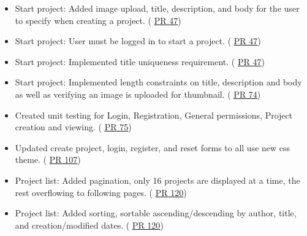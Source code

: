 \documentclass[11pt]{report}
\begin{document}
    \begin{itemize}
        \item Start project: Added image upload, title, description, and body for the user to specify when creating a project. (\color{blue} \href{https://github.com/uidaho/squireproject/pull/47}{\underline{PR 47}}\color{black})
        \item Start project: User must be logged in to start a project. (\color{blue} \href{https://github.com/uidaho/squireproject/pull/47}{\underline{PR 47}}\color{black})
        \item Start project: Implemented title uniqueness requirement. (\color{blue} \href{https://github.com/uidaho/squireproject/pull/47}{\underline{PR 47}}\color{black})
        \item Start project: Implemented length constraints on title, description and body as well as verifying an image is uploaded for thumbnail. (\color{blue} \href{https://github.com/uidaho/squireproject/pull/74}{\underline{PR 74}}\color{black})
        \item Created unit testing for Login, Registration, General permissions, Project creation and viewing. (\color{blue} \href{https://github.com/uidaho/squireproject/pull/75}{\underline{PR 75}}\color{black})
        \item Updated create project, login, register, and reset forms to all use new css theme. (\color{blue} \href{https://github.com/uidaho/squireproject/pull/107}{\underline{PR 107}}\color{black})
        \item Project list: Added pagination, only 16 projects are displayed at a time, the rest overflowing to following pages. (\color{blue} \href{https://github.com/uidaho/squireproject/pull/120}{\underline{PR 120}}\color{black})
        \item Project list: Added sorting, sortable ascending/descending by author, title, and creation/modified dates. (\color{blue} \href{https://github.com/uidaho/squireproject/pull/120}{\underline{PR 120}}\color{black})
    \end{itemize}
\end{document}
